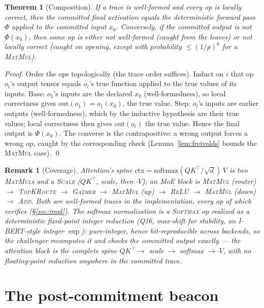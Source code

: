 \documentclass[11pt]{article}
\newtheorem{theorem}{Theorem}
\newtheorem{remark}{Remark}
\begin{document}
\begin{theorem}[Composition]\label{thm:compose}
If a trace is well-formed and every op is locally correct, then the committed final activation equals
the deterministic forward pass $\Phi$ applied to the committed input $x_0$. Conversely, if the
committed output is not $\Phi(x_0)$, then some op is either not well-formed (caught from the leaves)
or not locally correct (caught on opening, except with probability $\leq(1/p)^k$ for a \textsc{MatMul}).
\end{theorem}
\begin{proof}
Order the ops topologically (the trace order suffices). Induct on $i$ that op $o_i$'s output tensor
equals $o_i$'s true function applied to the true values of its inputs. Base: $o_1$'s inputs are the
declared $x_0$ (well-formedness), so local correctness gives $\mathrm{out}(o_1)=o_1(x_0)$, the true
value. Step: $o_i$'s inputs are earlier outputs (well-formedness), which by the inductive hypothesis
are their true values; local correctness then gives $\mathrm{out}(o_i)$ the true value. Hence the
final output is $\Phi(x_0)$. The converse is the contrapositive: a wrong output forces a wrong op,
caught by the corresponding check (Lemma~\ref{lem:freivalds} bounds the \textsc{MatMul} case). \qed
\end{proof}

\begin{remark}[Coverage]
Attention's spine $\mathrm{ctx}=\mathrm{softmax}(QK^\top/\sqrt d)\,V$ is two \textsc{MatMul}s and a
\textsc{Scale} ($QK^\top$, scale, then $\cdot V$); an MoE block is \textsc{MatMul} (router) $\to$
\textsc{TopKRoute} $\to$ \textsc{Gather} $\to$ \textsc{MatMul} (up) $\to$ \textsc{ReLU} $\to$
\textsc{MatMul} (down) $\to$ \textsc{Add}. Both are well-formed traces in the implementation, every op
of which verifies (\S\ref{sec:impl}). The softmax normalization is a \textsc{Softmax} op realized as a
\emph{deterministic fixed-point integer} reduction (Q16, max-shift for stability, an I-BERT-style
integer $\exp$): pure-integer, hence bit-reproducible across backends, so the challenger recomputes it
and checks the committed output exactly --- the attention block is the complete spine
$QK^\top\!\to$ scale $\to$ softmax $\to\cdot V$, with no floating-point reduction anywhere in the
committed trace.
\end{remark}

\section{The post-commitment beacon}\label{sec:beacon}
\end{document}
